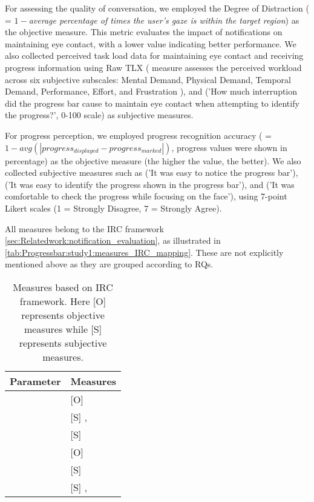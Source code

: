 For assessing the quality of conversation, we employed the Degree of Distraction (\distractionDigreee{} = $1 - $\textit{average percentage of times the user's gaze is within the target region}) as the objective measure. This metric evaluates the impact of notifications on maintaining eye contact, with a lower value indicating better performance. We also collected perceived task load data for maintaining eye contact and receiving progress information using Raw TLX (\perceivedTaskLoad{} measure assesses the perceived workload across six subjective subscales: Mental Demand, Physical Demand, Temporal Demand, Performance, Effort, and Frustration \cite{nasa_tlx_2006}), and \perceivedInterruption{} ('How much interruption did the progress bar cause to maintain eye contact when attempting to identify the progress?', 0-100 scale) as subjective measures.


For progress perception, we employed progress recognition accuracy (\progressAccuracy{} = $1 - avg(|progress_{displayed} - progress_{marked}|)$, progress values were shown in percentage) as the objective measure (the higher the value, the better). We also collected subjective measures such as \noticeability{} ('It was easy to notice the progress bar'), \perceivedEaseIdentification{} ('It was easy to identify the progress shown in the progress bar'), and \comfortability{} ('It was comfortable to check the progress while focusing on the face'), using 7-point Likert scales (1 = Strongly Disagree, 7 = Strongly Agree).

All measures belong to the IRC framework \autoref{sec:Relatedwork:notification_evaluation}, as illustrated in \autoref{tab:Progressbar:study1:measures_IRC_mapping}. These are not explicitly mentioned above as they are grouped according to RQs.


\begin{table}[hptb]
\centering
\caption[Measures based on IRC framework]{Measures based on IRC framework. Here [O] represents objective measures while [S] represents subjective measures.}
\label{tab:Progressbar:study1:measures_IRC_mapping}
\small
\begin{tabular}{@{}ll@{}}
\toprule
Parameter & Measures \\ \midrule
\Interruption{} &  [O] \distractionDigreee{} \\
     &  [S] \perceivedTaskLoad{}, \perceivedInterruption{} \\
\Reaction{} &  [S]  \noticeability{} \\
\Comprehension{} &  [O] \progressAccuracy{} \\
    & [S] \perceivedEaseIdentification{} \\
\Satisfaction{}  & [S] \preference{}, \comfortability{}  \\ 
\bottomrule
\end{tabular}
\end{table}

